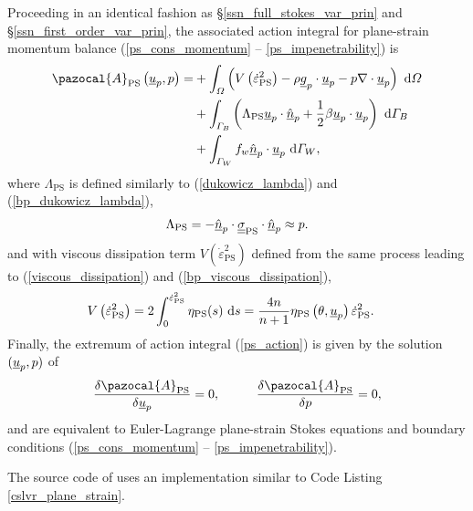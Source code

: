 Proceeding in an identical fashion as \S \ref{ssn_full_stokes_var_prin} and \S \ref{ssn_first_order_var_prin}, the associated action integral for plane-strain momentum balance (\ref{ps_cons_momentum} -- \ref{ps_impenetrability}) is
\begin{align}
  \label{ps_action}
  \pazocal{A}_{\text{PS}} \left(\rankone{u}_p, p\right) = &+ \int_{\Omega} \left( V\left( \dot{\varepsilon}_{\text{PS}}^2 \right) - \rho \rankone{g}_p \cdot \rankone{u}_p - p \nabla \cdot \rankone{u}_p \right) \d{\Omega} \notag \\
  &+ \int_{\Gamma_B} \left( \Lambda_{\text{PS}} \rankone{u}_p \cdot \normal_p + \frac{1}{2} \beta \rankone{u}_p \cdot \rankone{u}_p \right) \d{\Gamma_B} \notag \\
  &+ \int_{\Gamma_W} f_w \normal_p \cdot \rankone{u}_p \d{\Gamma_W},
\end{align}
where $\Lambda_{\text{PS}}$ is defined similarly to (\ref{dukowicz_lambda}) and (\ref{bp_dukowicz_lambda}),
\begin{align}
  \label{ps_dukowicz_lambda}
  \Lambda_{\text{PS}} = - \underline{\hat{n}}_p \cdot \underline{\underline{\sigma}}_{\text{PS}} \cdot \underline{\hat{n}}_p \approx p.
\end{align}
and with viscous dissipation term $V\left( \dot{\varepsilon}_{\text{PS}}^2 \right)$ defined from the same process leading to (\ref{viscous_dissipation}) and (\ref{bp_viscous_dissipation}), 
\begin{align}
  \label{ps_viscous_dissipation}
  V\left( \dot{\varepsilon}_{\text{PS}}^2 \right) &= 2 \int_0^{\dot{\varepsilon}_{\text{PS}}^2} \eta_{\text{PS}}(s) \ \mathrm{d}s = \frac{4n}{n+1} \eta_{\text{PS}}\left(\theta, \underline{u}_p \right) \dot{\varepsilon}_{\text{PS}}^2.
\end{align}
Finally, the extremum of action integral (\ref{ps_action}) is given by the solution $(\underline{u}_p, p)$ of
\begin{align}
  \label{ps_extremum}
  \frac{\delta \pazocal{A}_{\text{PS}}}{\delta \rankone{u}_p} = 0, \hspace{10mm} \frac{\delta \pazocal{A}_{\text{PS}}}{\delta p} = 0,
\end{align}
and are equivalent to Euler-Lagrange plane-strain Stokes equations and boundary conditions (\ref{ps_cons_momentum} -- \ref{ps_impenetrability}).

The source code of \CSLVR uses an implementation similar to Code Listing \ref{cslvr_plane_strain}.

